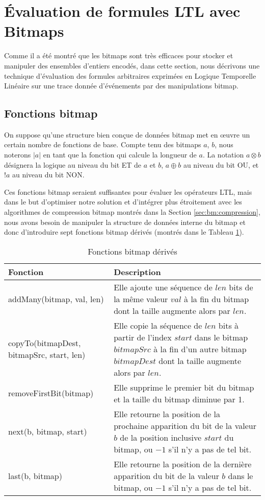 \section{Évaluation de formules LTL avec Bitmaps}\label{sec:bm:ltlbitmap} %

Comme il a été montré que les bitmaps sont très efficaces pour stocker et manipuler des ensembles d'entiers encodés, dans cette section, nous décrivons une technique d'évaluation des formules arbitraires exprimées en Logique Temporelle Linéaire sur une trace donnée d'événements par des manipulations bitmap.

\subsection{Fonctions bitmap}

On suppose qu'une structure bien conçue de données bitmap met en \oe{}uvre un certain nombre de fonctions de base. Compte tenu des bitmaps $a$, $b$, nous noterons $|a|$ en tant que la fonction qui calcule la longueur de $a$. La notation $a \otimes b$ désignera la logique au niveau du bit ET de $a$ et $b$, $a \oplus b$ au niveau du bit OU, et $!a$ au niveau du bit NON.

Ces fonctions bitmap seraient suffisantes pour évaluer les opérateurs LTL, mais dans le but d'optimiser notre solution et d'intégrer plus étroitement avec les algorithmes de compression bitmap montrés dans la Section \ref{sec:bm:compression}, nous avons besoin de manipuler la structure de données interne du bitmap et donc d'introduire sept fonctions bitmap dérivés (montrés dans le Tableau \ref{tbl:bm:bmhelpers}).

\begin{table}
\centering
\begin{tabular}{|p{1.5in}|p{3.25in}|}
\hline
Fonction & Description \\
\hline
addMany(bitmap, val, len) & Elle ajoute une séquence de $len$ bits de la même valeur $val$ à la fin du bitmap dont la taille augmente alors par $len$. \\
\hline
copyTo(bitmapDest, bitmapSrc, start, len) & Elle copie la séquence de $len$ bits à partir de l'index $start$ dans le bitmap $bitmapSrc$ à la fin d'un autre bitmap $bitmapDest$ dont la taille augmente alors par $len$. \\
\hline
removeFirstBit(bitmap) & Elle supprime le premier bit du bitmap et la taille du bitmap diminue par 1. \\
\hline
next(b, bitmap, start) & Elle retourne la position de la prochaine apparition du bit de la valeur $b$ de la position inclusive $start$ du bitmap, ou $-1$ s'il n'y a pas de tel bit. \\
\hline
last(b, bitmap) & Elle retourne la position de la dernière apparition du bit de la valeur $b$ dans le bitmap, ou $-1$ s'il n'y a pas de tel bit. \\
\hline
\end{tabular}
\caption{Fonctions bitmap dérivés}
\label{tbl:bm:bmhelpers}
\end{table}

